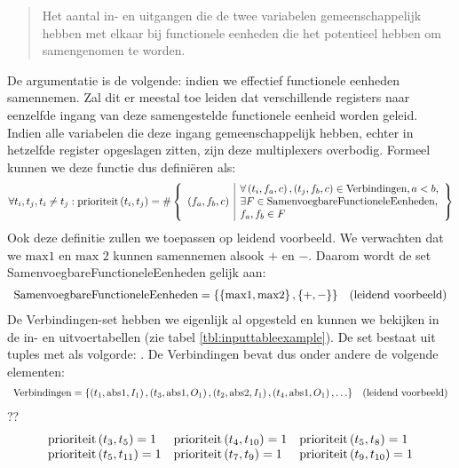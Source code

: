 \begin{quote}
Het aantal in- en uitgangen die de twee variabelen gemeenschappelijk hebben met elkaar bij functionele eenheden die het potentieel hebben om samengenomen te worden.
\end{quote}
De argumentatie is de volgende: indien we effectief functionele eenheden samennemen. Zal dit er meestal toe leiden dat verschillende registers naar eenzelfde ingang van deze samengestelde functionele eenheid worden geleid. Indien alle variabelen die deze ingang gemeenschappelijk hebben, echter in hetzelfde register opgeslagen zitten, zijn deze multiplexers overbodig. Formeel kunnen we deze functie dus defini\"eren als:
\begin{equation}
\forall t_i,t_j,t_i\neq t_j:\mbox{prioriteit}\left(t_i,t_j\right)=\#\left\{\begin{array}{l|l}
&\forall\left( t_i,f_a,c \right),\left( t_j,f_b,c \right)\in\mbox{Verbindingen}, a<b,\\
\left( f_a,f_b,c \right)&\exists F\in\mbox{SamenvoegbareFunctioneleEenheden},\\
&f_a,f_b\in F
\end{array}\right\}
\label{eqn:priorityMergingVariables}
\end{equation}
Ook deze definitie zullen we toepassen op leidend voorbeeld. We verwachten dat we $\mbox{max1}$ en $\mbox{max 2}$ kunnen samennemen alsook $+$ en $-$. Daarom wordt de set \mbox{SamenvoegbareFunctioneleEenheden} gelijk aan:
\begin{equation}
\begin{array}{ll}
\mbox{SamenvoegbareFunctioneleEenheden}=\left\{\left\{\mbox{max1},\mbox{max2}\right\},\left\{+,-\right\}\right\}&\mbox{(leidend voorbeeld)}
\end{array}
\end{equation}
De \mbox{Verbindingen}-set hebben we eigenlijk al opgesteld en kunnen we bekijken in de in- en uitvoertabellen (zie tabel \ref{tbl:inputtableexample}). De set bestaat uit tuples met als volgorde: . De \mbox{Verbindingen} bevat dus onder andere de volgende elementen:
\begin{equation}
\begin{array}{ll}
\mbox{Verbindingen}=\left\{\left( t_1,\mbox{abs1},I_1 \right),\left( t_3,\mbox{abs1},O_1 \right),\left( t_2,\mbox{abs2},I_1 \right),\left( t_4,\mbox{abs1},O_1 \right),\ldots\right\}&\mbox{(leidend voorbeeld)}
\end{array}
\end{equation}
??
\begin{equation}
\begin{array}{lll}
\mbox{prioriteit}\left( t_3,t_5 \right)=1&\mbox{prioriteit}\left( t_4,t_{10} \right)=1&\mbox{prioriteit}\left( t_5,t_8 \right)=1\\
\mbox{prioriteit}\left( t_5,t_{11} \right)=1&\mbox{prioriteit}\left( t_7,t_9 \right)=1&\mbox{prioriteit}\left( t_9,t_{10} \right)=1
\end{array}
\label{eqn:asmSqrtPriority}
\end{equation}
